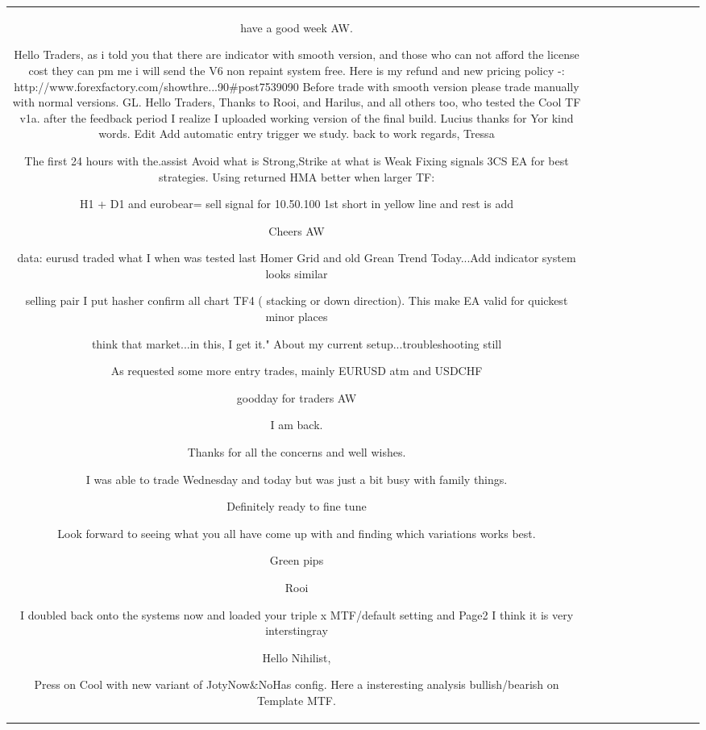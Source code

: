 \begin{table}[h!]
\begin{tabular}{|c|c|c|c|c|c|c|c|c|c|c|}
have a good week
AW. 

Hello Traders,
as i told you that there are indicator with smooth version, and those who can not afford the license cost they can pm me i will send the V6 non repaint system free. Here is my refund and new pricing policy -: http://www.forexfactory.com/showthre...90#post7539090 Before trade with smooth version please trade manually with normal versions.
GL.
Hello Traders,
Thanks to Rooi, and Harilus, and all others too, who tested the Cool TF v1a. after the feedback period I realize I uploaded working version of the final build.
Lucius thanks for Yor kind words.
Edit Add automatic entry trigger we study.
back to work 
regards, Tressa

The first 24 hours with the.assist
Avoid what is Strong,Strike at what is Weak
Fixing signals 3CS EA for best strategies.
Using returned HMA better when larger TF:


H1 + D1 and eurobear= sell signal for 10.50.100
1st short in yellow line and rest is add

Cheers
AW


data: eurusd traded what I when was tested last Homer Grid and old Grean Trend Today...Add indicator system looks similar

selling pair I put hasher confirm all chart TF4 ( stacking or down direction). This make EA valid for quickest minor places

think that market...in this, I get it." About my current setup...troubleshooting still

As requested some more entry trades, mainly EURUSD atm and USDCHF

goodday for traders
AW


I am back.

Thanks for all the concerns and well wishes.

I was able to trade Wednesday and today but was just a bit busy with family things.

Definitely ready to fine tune

Look forward to seeing what you all have come up with and finding which variations works best.

Green pips

Rooi


I doubled back onto the systems now and loaded your triple x MTF/default setting and Page2
I think it is very interstingray

Hello Nihilist,

Press on Cool with new variant of JotyNow\&NoHas config. Here a insteresting analysis bullish/bearish on Template MTF.



\end{tabular}
\end{table}
